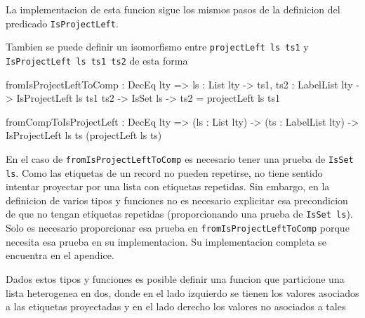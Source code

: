 La implementacion de esta funcion sigue los mismos pasos de la definicion del predicado \texttt{IsProjectLeft}. 

Tambien se puede definir un isomorfismo entre \texttt{projectLeft ls ts1} y \texttt{IsProjectLeft ls ts1 ts2} de esta forma

\begin{code}
fromIsProjectLeftToComp : DecEq lty => 
  {ls : List lty} -> {ts1, ts2 : LabelList lty} -> 
  IsProjectLeft ls ts1 ts2 -> 
  IsSet ls -> ts2 = projectLeft ls ts1

fromCompToIsProjectLeft : DecEq lty => (ls : List lty) -> 
  (ts : LabelList lty) -> 
  IsProjectLeft ls ts (projectLeft ls ts)
\end{code}

En el caso de \texttt{fromIsProjectLeftToComp} es necesario tener una prueba de \texttt{IsSet ls}. Como las etiquetas de un record no pueden repetirse, no tiene sentido intentar proyectar por una lista con etiquetas repetidas. Sin embargo, en la definicion de varios tipos y funciones no es necesario explicitar esa precondicion de que no tengan etiquetas repetidas (proporcionando una prueba de \texttt{IsSet ls}). Solo es necesario proporcionar esa prueba en \texttt{fromIsProjectLeftToComp} porque necesita esa prueba en su implementacion. Su implementacion completa se encuentra en el apendice.

Dados estos tipos y funciones es posible definir una funcion que particione una lista heterogenea en dos, donde en el lado izquierdo se tienen los valores asociados a las etiquetas proyectadas y en el lado derecho los valores no asociados a tales

